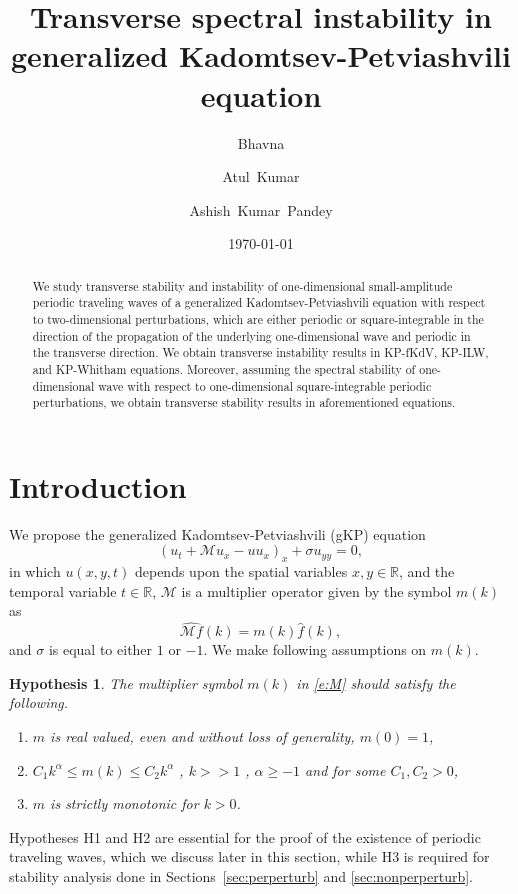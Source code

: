 \documentclass[12pt]{amsart}    %
\title[Transverse instability in generalized KP equation]{Transverse spectral instability in generalized Kadomtsev-Petviashvili equation}
\author[Bhavna]{Bhavna}
\author[Kumar]{Atul~Kumar}
\author[Pandey]{Ashish~Kumar~Pandey}
\date{\today}
\renewcommand{\geq}{\geqslant}
\renewcommand{\leq}{\leqslant}
\newcommand{\R}{\mathbb{R}}
\newcommand{\calM}{\mathcal{M}}
\newtheorem{hypothesis}[theorem]{Hypothesis}
\numberwithin{equation}{section}
\begin{document}
\maketitle

\begin{abstract}
   We study transverse stability and instability of one-dimensional small-amplitude periodic traveling waves of a generalized Kadomtsev-Petviashvili equation with respect to two-dimensional perturbations, which are either periodic or square-integrable in the direction of the propagation of the underlying one-dimensional wave and periodic in the transverse direction. We obtain transverse instability results in KP-fKdV, KP-ILW, and KP-Whitham equations. Moreover, assuming the spectral stability of one-dimensional wave with respect to one-dimensional square-integrable periodic perturbations, we obtain transverse stability results in aforementioned equations.
\end{abstract}
\section{Introduction}\label{sec:intro}

We propose the generalized Kadomtsev-Petviashvili (gKP) equation
\begin{equation}\label{e:gkp}
\left( u_t+\calM u_x-u u_x\right)_x+\sigma u_{yy}=0,
\end{equation}
in which $u(x,y,t)$ depends upon the spatial variables $x,y\in\R$, and
the temporal variable $t\in\R$, $\calM$ is a multiplier operator given by the symbol $m(k)$ as 
\begin{equation}\label{e:M}
    \widehat{\calM f}(k)=m(k)\widehat{f}(k),
\end{equation}
and $\sigma$ is equal to either $1$ or $-1$. 
We make following assumptions on $m(k)$.
\begin{hypothesis}\label{h:m} The multiplier symbol $m(k)$ in \eqref{e:M} should satisfy the following.
\begin{enumerate}[label=H\arabic*. , wide=0.5em,  leftmargin=*]
    \item $m$ is real valued, even and without loss of generality, $m(0)=1$,
    \item $C_1 k^\alpha \leq m(k) \leq C_2 k^\alpha$ , 
$ k >> 1$ , $\alpha \geq -1$ and for some $C_1 , C_2 > 0$,
\item $m$ is strictly monotonic for $k>0$.
\end{enumerate}
\end{hypothesis}
Hypotheses H1 and H2 are essential for the proof of the existence of periodic traveling waves, which we discuss later in this section, while H3 is required for stability analysis done in Sections~\ref{sec:perperturb} and \ref{sec:nonperperturb}.
\end{document}
